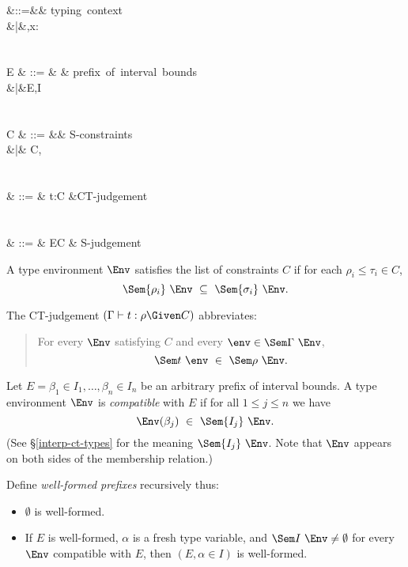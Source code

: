 \documentclass{amsart}
\theoremstyle{definition}
\begin{document}
\begin{syntax}
\Gamma &::=&\emptyset& \mbox{typing context}\\
&|&\Gamma,x:\sigma\\
\\\\
E & ::= & \emptyset & \mbox{prefix of interval bounds}\\
&|&E,\alpha\in I\\
\\\\
C & ::= &\emptyset& \mbox{S-constraints}\\
&|& C,\rho\le\tau\\
\\\\
\JCT & ::= & \Gamma\vdash t:\rho\Given C
&\mbox{CT-judgement}\\
\\\\
\JS & ::= & E\vdash C & \mbox{S-judgement}
\end{syntax}

A type environment $\Env$ satisfies the list of constraints $C$
if for each $\rho_i\le\tau_i\in C$,
\[
\Sem{\rho_i}~\Env\ \subseteq\ \Sem{\sigma_i}~\Env.
\]

The CT-judgement $(\Gamma\vdash t:\rho\Given C)$ abbreviates:
\begin{quotation}
For every $\Env$ satisfying $C$ and every
$\env\in\Sem\Gamma~\Env$,
\[
\Sem t~\env\ \in\ \Sem\rho~\Env.
\]
\end{quotation}

Let $E=\beta_1\in I_1,\ldots,\beta_n\in I_n$ be an arbitrary
prefix of interval bounds. A type environment $\Env$ is
\emph{compatible} with $E$ if for all $1\le j\le n$ we have
\[
\Env(\beta_j)\ \in\ \Sem{I_j}~\Env.
\]
(See \S\ref{interp-ct-types} for the meaning $\Sem{I_j}~\Env$.
Note that $\Env$ appears on both sides of the membership relation.)

\begin{samepage}
Define \emph{well-formed prefixes} recursively thus:
\begin{itemize}
\item $\emptyset$ is well-formed.
\item If $E$ is well-formed, $\alpha$ is a fresh type variable,
and $\Sem I~\Env\neq\emptyset$ for every $\Env$ compatible with
$E$, then $(E,\alpha\in I)$ is well-formed.
\end{itemize}
\end{samepage}
\end{document}
